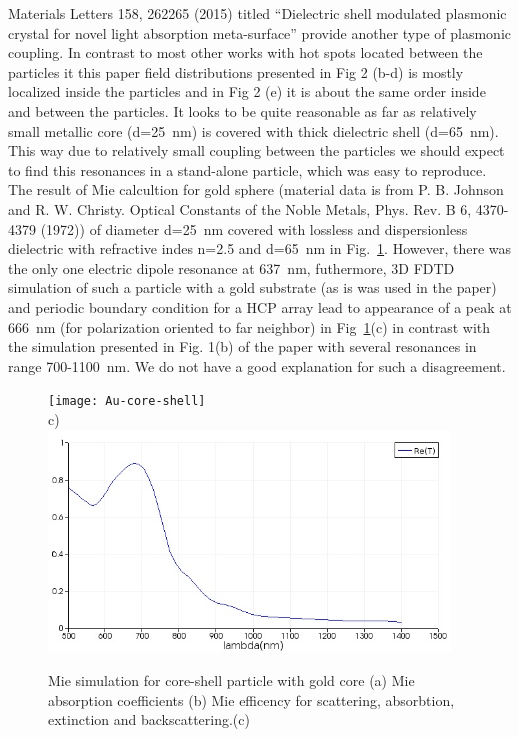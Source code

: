 \documentclass[a4paper]{article}
\begin{document}
Materials Letters 158, 262265 (2015) titled ``Dielectric shell
modulated plasmonic crystal for novel light absorption meta-surface''
provide another type of plasmonic coupling. In contrast to most other
works with hot spots located between the particles it this paper field
distributions presented in Fig 2 (b-d) is mostly localized inside the
particles and in Fig 2 (e) it is about the same order inside and
between the particles. It looks to be quite reasonable as far as
relatively small metallic core (d=25~nm) is covered with thick
dielectric shell (d=65~nm). This way due to relatively small coupling
between the particles we should expect to find this resonances in a
stand-alone particle, which was easy to reproduce. The result of Mie
calcultion for gold sphere (material data is from P. B. Johnson and
R. W. Christy. Optical Constants of the Noble Metals, Phys. Rev. B 6,
4370-4379 (1972)) of diameter d=25~nm covered with lossless and
dispersionless dielectric with refractive indes n=2.5 and d=65~nm in
Fig.~\ref{fig:Au-core-shell}. However, there was the only one electric
dipole resonance at 637~nm, futhermore, 3D FDTD simulation of such a
particle with a gold substrate (as is was used in the paper) and
periodic boundary condition for a HCP array lead to appearance of a
peak at 666~nm (for polarization oriented to far neighbor) in
Fig~\ref{fig:Au-core-shell}(c)  in contrast
with the simulation presented in Fig. 1(b) of the paper with several
resonances in range 700-1100~nm.  We do not
have a good explanation for such a disagreement.
\begin{figure}
  \texttt{[image: Au-core-shell]}\\
  c)\\
   \includegraphics[width=0.95\textwidth]{fdtd-hcp}
  \caption{Mie simulation for core-shell particle with gold core (a)
    Mie absorption coefficients (b) Mie efficency for scattering,
    absorbtion, extinction and backscattering.(c)\label{fig:Au-core-shell}}
\end{figure}
\end{document}
